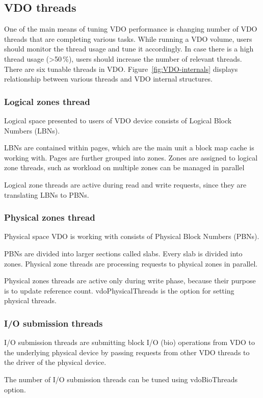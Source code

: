 \documentclass[
  color, %
  table, %
  lof,   %
  lot,   %
]{fithesis3}
\begin{document}
\subsection{VDO threads}
One of the main means of tuning VDO performance is changing number of VDO threads that are completing various tasks. While running a VDO volume, users should monitor the thread usage and tune it accordingly. In case there is a high thread usage (>50\,\%), users should increase the number of relevant threads. There are six tunable threads in VDO. Figure~\ref{fig:VDO-internals} displays relationship between various threads and VDO internal structures.

\subsubsection{Logical zones thread}
Logical space presented to users of VDO device consists of Logical Block Numbers (LBNs).

LBNs are contained within pages, which are the main unit a block map cache is working with. Pages are further grouped into zones. Zones are assigned to logical zone threads, such as workload on multiple zones can be managed in parallel

Logical zone threads are active during read and write requests, since they are translating LBNs to PBNs.

\subsubsection{Physical zones thread}
Physical space VDO is working with consists of Physical Block Numbers (PBNs).

PBNs are divided into larger sections called slabs. Every slab is divided into zones. Physical zone threads are processing requests to physical zones in parallel.

Physical zones threads are active only during write phase, because their purpose is to update reference count. vdoPhysicalThreads is the option for setting physical threads.


\subsubsection{I/O submission threads}
I/O submission threads are submitting block I/O (bio) operations from VDO to the underlying physical device by passing requests from other VDO threads to the driver of the physical device. 

The number of I/O submission threads can be tuned using vdoBioThreads option.
\end{document}
